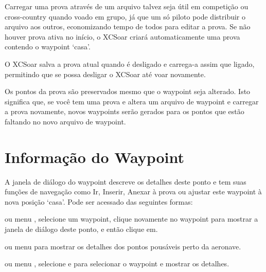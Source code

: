 Carregar uma prova através de um arquivo talvez seja útil em competição ou cross-country quando voado em grupo, já que um só piloto pode distribuir o arquivo aos outros, economizando tempo de todos para editar a prova.  Se não houver prova ativa no início, o XCSoar criará automaticamente uma prova contendo o waypoint ‘casa’.

O XCSoar salva a prova atual quando é desligado e carrega-a assim que ligado, permitindo que se possa desligar o XCSoar até voar novamente.

Os pontos da prova são preservados mesmo que o waypoint seja alterado.  Isto significa que, se você tem uma prova e altera um arquivo de waypoint e carregar a prova novamente, novos waypoints serão gerados para os pontos que estão faltando no novo arquivo de waypoint.



\section{Informação do Waypoint }

A janela de diálogo do waypoint descreve os detalhes deste ponto e tem suas funções de navegação como Ir, Inserir, Anexar à prova ou ajustar este waypoint à nova posição ‘casa’.  Pode ser acessado das seguintes formas:

ou menu \blink{},
selecione um waypoint, clique novamente no waypoint para mostrar a janela de diálogo deste ponto, e então clique em.

ou menu \blink{}
para mostrar os detalhes dos pontos pousáveis perto da aeronave.

ou menu \blink{}
, selecione e para selecionar o waypoint e mostrar os detalhes.

